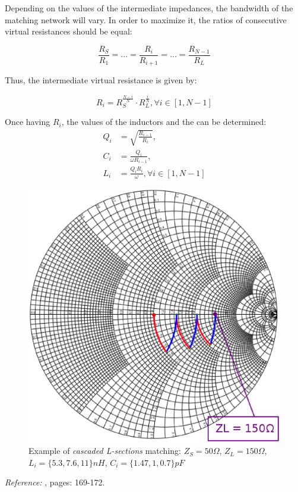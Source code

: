 Depending on the values of the intermediate impedances, the bandwidth of the matching network will vary. In order to maximize it, the ratios of consecutive virtual resistances should be equal:

\begin{equation}
  \frac{R_S}{R_1} = ... = \frac{R_{i}}{R_{i+1}} = ... = \frac{R_{N-1}}{R_{L}}
\end{equation}

\noindent Thus, the intermediate virtual resistance is given by:

\begin{equation}
R_i = R_S^{\frac{N-i}{N}} \cdot R_L^{\frac{i}{N}}, \forall i \in [1, N-1]
\end{equation}


\noindent Once having $R_i$, the values of the inductors and the can be determined:
\begin{align}
Q_i & = \sqrt {\frac{R_{i-1}}{R_i}},\\
C_i & = \frac{Q_i}{\omega R_{i-1}}, \\
L_i & = \frac{Q_i R_i}{\omega},  \forall i \in [1, N-1]
\end{align}


\begin{figure}[H]
\centering
\includegraphics[width=120mm]{SmithCascadedLCsections}
\caption{Example of \textit{cascaded L-sections} matching: $Z_S = 50\Omega$, $Z_L = 150\Omega$, $L_i = \lbrace 5.3, 7.6, 11\rbrace nH$, $C_i = \lbrace 1.47, 1, 0.7 \rbrace pF$}
\end{figure}


\noindent \textit{Reference:} \cite{BahlFundamentalsRFMW}, pages: 169-172.
